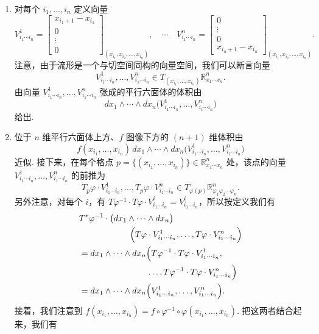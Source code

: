 \begin{enumerate}
  \item 对每个 $i_1,\ldots,i_n$ 定义向量
  \[
  V^1_{i_1\cdots i_n}=\begin{bmatrix}x_{i_1+1}-x_{i_1}\\0\\\vdots\\0\end{bmatrix}_{(x_{i_1},x_{i_2},\ldots,x_{i_n})},\quad\cdots\quad
  V^n_{i_1\cdots i_n}=\begin{bmatrix}0\\\vdots\\0\\x_{i_n+1}-x_{i_n}\end{bmatrix}_{(x_{i_1},x_{i_2},\ldots,x_{i_n})}.
  \]
  注意，由于流形是一个与切空间同构的向量空间，我们可以断言向量
\[
V^1_{i_1\cdots i_n},\ldots,V^n_{i_1\cdots i_n}\in T_{(x_{i_1},\ldots,x_{i_n})}\mathbb{R}^n_{x_1\cdots x_n}.
\]
由向量 $V^1_{i_1\cdots i_n},\ldots,V^n_{i_1\cdots i_n}$ 张成的平行六面体的体积由
  \[
  dx_1\wedge\cdots\wedge dx_n\bigl(V^1_{i_1\cdots i_n},\ldots,V^n_{i_1\cdots i_n}\bigr)
  \]
  给出.
  \item 位于 $n$ 维平行六面体上方、$f$ 图像下方的 $(n+1)$ 维体积由
  \[
  f(x_{i_1},\ldots,x_{i_n})\,dx_1\wedge\cdots\wedge dx_n\bigl(V^1_{i_1\cdots i_n},\ldots,V^n_{i_1\cdots i_n}\bigr)
  \]
  近似. 接下来，在每个格点 $p=\{(x_{i_1},\ldots,x_{i_n})\}\in\mathbb{R}^n_{x_1\cdots x_n}$ 处，该点的向量 $V^1_{i_1\cdots i_n},\ldots,V^n_{i_1\cdots i_n}$ 的前推为
  \[
  T_p\varphi\cdot V^1_{i_1\cdots i_n},\ldots,T_p\varphi\cdot V^n_{i_1\cdots i_n}\in T_{\varphi(p)}\mathbb{R}^n_{\varphi_1\varphi_2\cdots\varphi_n}.
  \]
  另外注意，对每个 $i$，有 $T\varphi^{-1}\cdot T\varphi\cdot V^i_{i_1\cdots i_n}=V^i_{i_1\cdots i_n}$，所以按定义我们有
  \begin{align*}
  &T^*\varphi^{-1}\cdot\bigl(dx_1\wedge\cdots\wedge dx_n\bigr)\\
  &\qquad\qquad\qquad\Bigl(T\varphi\cdot V^1_{i_1\cdots i_n},\ldots,T\varphi\cdot V^n_{i_1\cdots i_n}\Bigr)\\
  &=dx_1\wedge\cdots\wedge dx_n\Bigl(T\varphi^{-1}\cdot T\varphi\cdot V^1_{i_1\cdots i_n},\\
  &\qquad\qquad\qquad\qquad\ldots,T\varphi^{-1}\cdot T\varphi\cdot V^n_{i_1\cdots i_n}\Bigr)\\
  &=dx_1\wedge\cdots\wedge dx_n\Bigl(V^1_{i_1\cdots i_n},\ldots,V^n_{i_1\cdots i_n}\Bigr).
  \end{align*}
  接着，我们注意到 $f(x_{i_1},\ldots,x_{i_n})=f\circ\varphi^{-1}\circ\varphi(x_{i_1},\ldots,x_{i_n})$. 把这两者结合起来，我们有

\end{enumerate}
